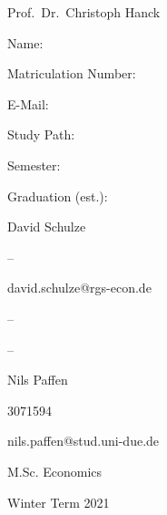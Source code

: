 \documentclass[12pt,a4paper]{article}
\begin{document}
\begin{titlepage}
  \noindent\begin{minipage}[t]{0.3\textwidth}
  \end{minipage}
  \begin{minipage}[t]{0.7\textwidth}
  \hspace{1cm}Prof.~Dr.~Christoph Hanck
  \end{minipage}

  \noindent\begin{minipage}[t]{0.3\textwidth}
  \end{minipage}
  \begin{minipage}[t]{0.7\textwidth}
  \hspace{1cm}
  \end{minipage}

  \hrulefill

  \begin{multicols}{3}

  Name:

  Matriculation Number:

  E-Mail:

  Study Path:

  Semester:

  Graduation (est.):
 
  \columnbreak

  David Schulze

  --
  
  david.schulze@rgs-econ.de

  --


  -- 
  
  \columnbreak

  Nils Paffen

  3071594
  
  nils.paffen@stud.uni-due.de

  M.Sc. Economics


  Winter Term 2021

	\end{multicols}

\end{titlepage}



{
\hypersetup{linkcolor=black}

\setcounter{tocdepth}{3}
\tableofcontents
}
\end{document}

